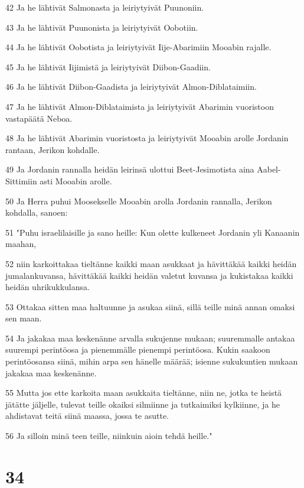 \par 42 Ja he lähtivät Salmonasta ja leiriytyivät Puunoniin.
\par 43 Ja he lähtivät Puunonista ja leiriytyivät Oobotiin.
\par 44 Ja he lähtivät Oobotista ja leiriytyivät Iije-Abarimiin Mooabin rajalle.
\par 45 Ja he lähtivät Iijimistä ja leiriytyivät Diibon-Gaadiin.
\par 46 Ja he lähtivät Diibon-Gaadista ja leiriytyivät Almon-Diblataimiin.
\par 47 Ja he lähtivät Almon-Diblataimista ja leiriytyivät Abarimin vuoristoon vastapäätä Neboa.
\par 48 Ja he lähtivät Abarimin vuoristosta ja leiriytyivät Mooabin arolle Jordanin rantaan, Jerikon kohdalle.
\par 49 Ja Jordanin rannalla heidän leirinsä ulottui Beet-Jesimotista aina Aabel-Sittimiin asti Mooabin arolle.
\par 50 Ja Herra puhui Moosekselle Mooabin arolla Jordanin rannalla, Jerikon kohdalla, sanoen:
\par 51 "Puhu israelilaisille ja sano heille: Kun olette kulkeneet Jordanin yli Kanaanin maahan,
\par 52 niin karkoittakaa tieltänne kaikki maan asukkaat ja hävittäkää kaikki heidän jumalankuvansa, hävittäkää kaikki heidän valetut kuvansa ja kukistakaa kaikki heidän uhrikukkulansa.
\par 53 Ottakaa sitten maa haltuunne ja asukaa siinä, sillä teille minä annan omaksi sen maan.
\par 54 Ja jakakaa maa keskenänne arvalla sukujenne mukaan; suuremmalle antakaa suurempi perintöosa ja pienemmälle pienempi perintöosa. Kukin saakoon perintöosansa siinä, mihin arpa sen hänelle määrää; isienne sukukuntien mukaan jakakaa maa keskenänne.
\par 55 Mutta jos ette karkoita maan asukkaita tieltänne, niin ne, jotka te heistä jätätte jäljelle, tulevat teille okaiksi silmiinne ja tutkaimiksi kylkiinne, ja he ahdistavat teitä siinä maassa, jossa te asutte.
\par 56 Ja silloin minä teen teille, niinkuin aioin tehdä heille."

\chapter{34}

